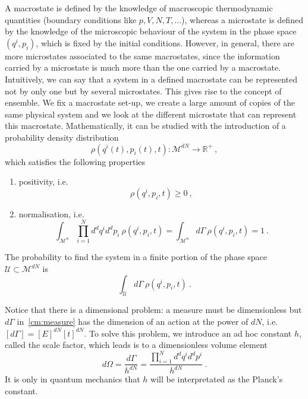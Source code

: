    A macrostate is defined by the knowledge of macroscopic thermodynamic quantities (boundary conditions like $p, V, N, T, \ldots$), whereas a microstate is defined by the knowledge of the microscopic behaviour of the system in the phase space $(q^i, p_i)$, which is fixed by the initial conditions. However, in general, there are more microstates associated to the same macrostates, since the information carried by a microstate is much more than the one carried by a macrostate. Intuitively, we can say that a system in a defined macrostate can be represented not by only one but by several microstates. This gives rise to the concept of ensemble. We fix a macrostate set-up, we create a large amount of copies of the same physical system and we look at the different microstate that can represent this macrostate. Mathematically, it can be studied with the introduction of a probability density distribution 
    \begin{equation*}
        \rho(q^i(t), p_i(t),t) \colon \mathcal M^{dN} \rightarrow \mathbb R^+ ~,
    \end{equation*}
    which satisfies the following properties
    \begin{enumerate}
        \item positivity, i.e.
        \begin{equation*}
            \rho(q^i, p_i, t) \geq 0 ~,
        \end{equation*}
        \item normalisation, i.e.
        \begin{equation}\label{cm:norm}
            \int_{\mathcal M^n} \prod_{i=1}^N d^d q^i d^d p_i ~ \rho(q^i, p_i, t) = \int_{\mathcal M^n} d\Gamma ~ \rho(q^i, p_i, t) = 1 ~.
        \end{equation}
    \end{enumerate}
    The probability to find the system in a finite portion of the phase space $\mathcal U \subset \mathcal M^{dN}$ is 
    \begin{equation*}
        \int_{\mathcal U} d\Gamma ~ \rho(q^i, p_i, t) ~.
    \end{equation*}

    Notice that there is a dimensional problem: a measure must be dimensionless but $d\Gamma$ in~\eqref{cm:measure} has the dimension of an action at the power of $dN$, i.e. $[d\Gamma] = [E]^{dN} [t]^{dN}$. To solve this problem, we introduce an ad hoc constant $h$, called the scale factor, which leads is to a dimensionless volume element
    \begin{equation}\label{cm:measure2}
        d \Omega = \frac{d\Gamma}{h^{dN}} = \frac{\prod_{i=1}^N d^d q^i d^d p^i}{h^{dN}} ~.
    \end{equation}
    It is only in quantum mechanics that $h$ will be interpretated as the Planck's constant.

